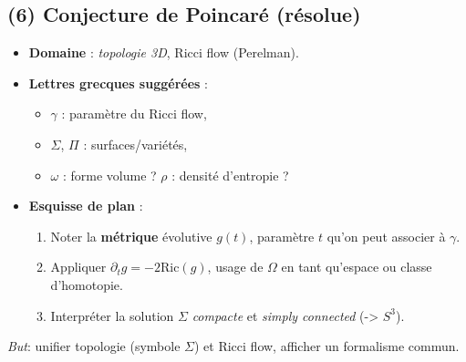 \documentclass[12pt]{article}
\begin{document}
\subsection{(6) Conjecture de Poincaré (résolue)}
\begin{itemize}
    \item \textbf{Domaine} : \emph{topologie 3D}, Ricci flow (Perelman).
    \item \textbf{Lettres grecques suggérées} :
    \begin{itemize}
        \item \(\gamma\) : paramètre du Ricci flow, 
        \item \(\Sigma\), \(\Pi\) : surfaces/variétés, 
        \item \(\omega\) : forme volume ? \(\rho\) : densité d’entropie ?
    \end{itemize}
    \item \textbf{Esquisse de plan} :
    \begin{enumerate}
        \item Noter la \textbf{métrique} évolutive $g(t)$, paramètre $t$ qu’on peut associer à \(\gamma\).
        \item Appliquer $ \partial_t g = -2 \mathrm{Ric}(g)$, 
              usage de \(\Omega\) en tant qu’espace ou classe d’homotopie.
        \item Interpréter la solution \(\Sigma\) \emph{compacte} et \emph{simply connected} (-> $S^3$).
    \end{enumerate}
\end{itemize}
\emph{But}: unifier topologie (symbole \(\Sigma\)) et Ricci flow, afficher un formalisme commun.
\end{document}

